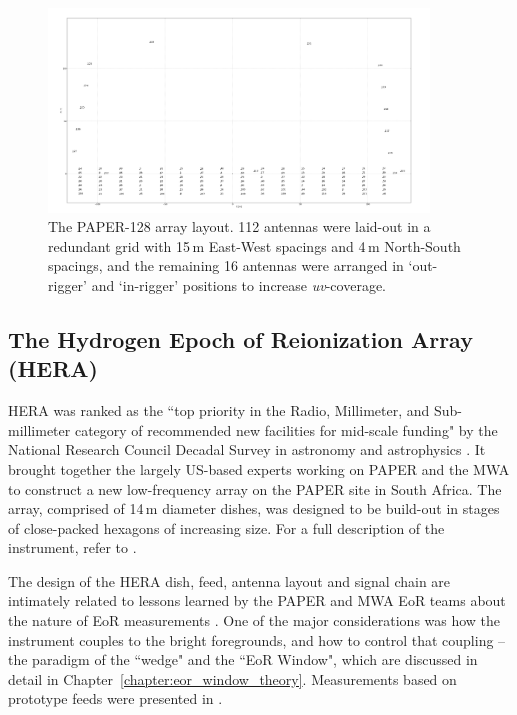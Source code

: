 \begin{figure}
\centering
\includegraphics[width=0.9\textwidth]{chapters/instruments/figures/antlayout_psa128.png}
\caption[The PAPER-128 array layout.]{The PAPER-128 array layout. 112 antennas were laid-out in a redundant grid with 15\,m East-West spacings and 4\,m North-South spacings, and the remaining 16 antennas were arranged in `out-rigger' and `in-rigger' positions to increase \textit{uv}-coverage.}
\label{fig:instruments_psa128}
\end{figure}

\subsection{The Hydrogen Epoch of Reionization Array (HERA)}
\label{subsec:hera_instrument}

HERA was ranked as the ``top priority in the Radio, Millimeter, and Sub-millimeter category of recommended new facilities for mid-scale funding" by the National Research Council Decadal Survey in astronomy and astrophysics \citep{Astro2010}. It brought together the largely US-based experts working on PAPER and the MWA to construct a new low-frequency array on the PAPER site in South Africa. The array, comprised of 14\,m diameter dishes, was designed to be build-out in stages of close-packed hexagons of increasing size. For a full description of the instrument, refer to \cite{deBoer.17}.

The design of the HERA dish, feed, antenna layout and signal chain are intimately related to lessons learned by the PAPER and MWA EoR teams about the nature of EoR measurements \citep[e.g.][]{Nithya.15a}. One of the major considerations was how the instrument couples to the bright foregrounds, and how to control that coupling -- the paradigm of the ``wedge" and the ``EoR Window", which are discussed in detail in Chapter~\ref{chapter:eor_window_theory}. Measurements based on prototype feeds were presented in \cite[][Patra et al. \textit{submitted}]{Ewall-Wice.16.HERA_Dish, Neben.16}.

